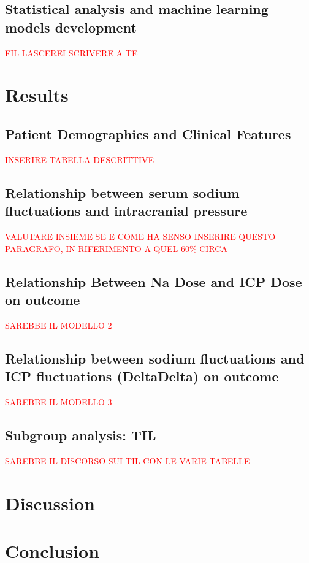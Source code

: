 \subsection{Statistical analysis and machine learning models development}
\textcolor{red}{FIL LASCEREI SCRIVERE A TE}

\section {Results}
\subsection{Patient Demographics and Clinical Features}
\textcolor{red}{INSERIRE TABELLA DESCRITTIVE}

\subsection{Relationship between serum sodium fluctuations and intracranial pressure}
\textcolor{red}{VALUTARE INSIEME SE E COME HA SENSO INSERIRE QUESTO PARAGRAFO, IN RIFERIMENTO A QUEL 60\% CIRCA}

\subsection{Relationship Between Na Dose and ICP Dose on outcome}
\textcolor{red}{SAREBBE IL MODELLO 2}

\subsection{Relationship between sodium fluctuations and ICP fluctuations (DeltaDelta) on outcome}
\textcolor{red}{SAREBBE IL MODELLO 3}

\subsection{Subgroup analysis: TIL}
\textcolor{red}{SAREBBE IL DISCORSO SUI TIL CON LE VARIE TABELLE}

\section{Discussion}

\section{Conclusion}





